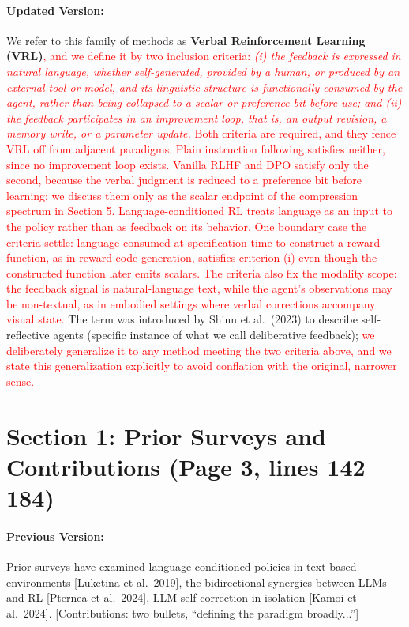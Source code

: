\documentclass[11pt]{article}
\newcommand{\red}[1]{\textcolor{red}{#1}}
\begin{document}
\paragraph{Updated Version:} We refer to this family of methods as \textbf{Verbal Reinforcement Learning (VRL)}\red{, and we define it by two inclusion criteria: \textit{(i) the feedback is expressed in natural language, whether self-generated, provided by a human, or produced by an external tool or model, and its linguistic structure is functionally consumed by the agent, rather than being collapsed to a scalar or preference bit before use; and (ii) the feedback participates in an improvement loop, that is, an output revision, a memory write, or a parameter update.} Both criteria are required, and they fence VRL off from adjacent paradigms. Plain instruction following satisfies neither, since no improvement loop exists. Vanilla RLHF and DPO satisfy only the second, because the verbal judgment is reduced to a preference bit before learning; we discuss them only as the scalar endpoint of the compression spectrum in Section 5. Language-conditioned RL treats language as an input to the policy rather than as feedback on its behavior. One boundary case the criteria settle: language consumed at specification time to construct a reward function, as in reward-code generation, satisfies criterion (i) even though the constructed function later emits scalars. The criteria also fix the modality scope: the feedback signal is natural-language text, while the agent's observations may be non-textual, as in embodied settings where verbal corrections accompany visual state.} The term was introduced by Shinn et al.\ (2023) to describe self-reflective agents (specific instance of what we call deliberative feedback); \red{we deliberately generalize it to any method meeting the two criteria above, and we state this generalization explicitly to avoid conflation with the original, narrower sense.}

\section{Section 1: Prior Surveys and Contributions (Page 3, lines 142--184)}

\paragraph{Previous Version:} Prior surveys have examined language-conditioned policies in text-based environments [Luketina et al.\ 2019], the bidirectional synergies between LLMs and RL [Pternea et al.\ 2024], LLM self-correction in isolation [Kamoi et al.\ 2024]. [Contributions: two bullets, ``defining the paradigm broadly...'']
\end{document}
